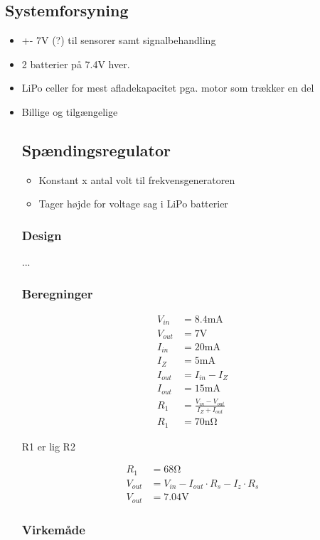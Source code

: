 \subsection{Systemforsyning}
\begin{itemize}
	\item +- 7V (?) til sensorer samt signalbehandling
	\item 2 batterier på 7.4V hver. 
	\item LiPo celler for mest afladekapacitet pga. motor som trækker en del
	\item Billige og tilgængelige
	
\subsection{Spændingsregulator}
\begin{itemize}
	\item Konstant x antal volt til frekvensgeneratoren
	\item Tager højde for voltage sag i LiPo batterier
\end{itemize}

	
	\subsubsection{Design}
	...
	
	\subsubsection{Beregninger}
	
	\begin{align}
	V_{in} & = 8.4 \si{\milli\ampere} \nonumber \\
	V_{out} & = 7 \si{\volt} \nonumber \\
	I_{in} & = 20\si{\milli\ampere} \nonumber \\
	I_Z & = 5 \si{\milli\ampere} \nonumber \\
	I_{out} & = I_{in} - I_Z \\
	I_{out} & = 15 \si{\milli\ampere} \nonumber \\
	R_1 & = \frac{V_{in} - V_{out}}{I_Z + I_{out}} \label{eq:RegulatorModstand} \\
	R_1 & = 70 \si{\nano\ohm} \label{eq:RegulatorModstandBeregnet}
	\end{align}
	
	R1 er lig R2
	
	\begin{align}
	R_1 & = 68 \si{\ohm} \nonumber \\
	V_{out} & = V_{in} - I_{out} \cdot R_s - I_z \cdot R_s \label{eq:RegulatorUdgangsPotentiale} \\
	V_{out} & = 7.04 \si{\volt} \label{eq:RegulatorBeregnetPotentiale} 
	\end{align}
	
	\subsubsection{Virkemåde}
\end{itemize}


